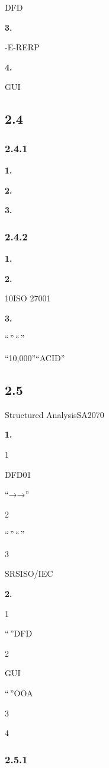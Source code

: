 DFD

\textbf{3.}

-E-RERP

\textbf{4.}

GUI

\subsection{2.4}\label{section-29}

\subsubsection{2.4.1}\label{section-30}

\textbf{1.}

\textbf{2.}

\textbf{3.}

\subsubsection{2.4.2}\label{section-31}

\textbf{1.}

\textbf{2.}

10ISO 27001

\textbf{3.}

``\,''\,``\,''

``10,000''``ACID''

\subsection{2.5}\label{section-32}

Structured AnalysisSA2070

\textbf{1.}

1

DFD01

``→→''

2

``\,''\,``\,''

3

SRSISO/IEC

\textbf{2.}

1

``\,''DFD

2

GUI

``\,''OOA

3

4

\subsubsection{2.5.1}\label{section-33}

